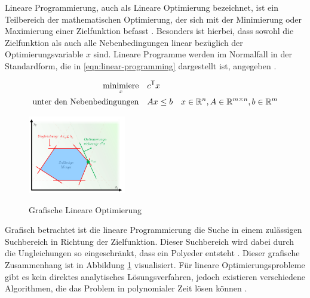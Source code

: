 Lineare Programmierung, auch als Lineare Optimierung bezeichnet, ist ein Teilbereich der mathematischen Optimierung, der sich mit der Minimierung oder Maximierung einer Zielfunktion befasst \cite{2024.MathWorksLP}. Besonders ist hierbei, dass sowohl die Zielfunktion als auch alle Nebenbedingungen linear bezüglich der Optimierungsvariable $x$ sind. Lineare Programme werden im Normalfall in der Standardform, die in \ref{eqn:linear-programming} dargestellt ist, angegeben \cite[S. 6]{2023.ConvexOptimization}.

\vspace*{-0.2cm}
\begin{align}
    \label{eqn:linear-programming}
    \minimize_{x}                     & \quad c^\mathsf{T} x                                                                                                    \\
    \text{unter den Nebenbedingungen} & \quad Ax \leq b      & x \in \mathbb{R}^{n}, A \in \mathbb{R}^{m\times n}, b \in \mathbb{R}^{m} \vspace*{-0.2cm} \notag
\end{align}

\begin{figure}
    \centering
    \vspace*{-0.75cm}
    \includegraphics[width=0.38\textwidth]{res/pictures/linear-programming.png}
    \caption[Grafische Lineare Optimierung]{\unskip}
    Grafische Lineare Optimierung
    \label{fig:linear-programming}
    \vspace*{-0.75cm}
\end{figure}

Grafisch betrachtet ist die lineare Programmierung die Suche in einem zulässigen Suchbereich in Richtung der Zielfunktion. Dieser Suchbereich wird dabei durch die Ungleichungen so eingeschränkt, dass ein Polyeder entsteht \cite[S. 31]{2023.ConvexOptimization}. Dieser grafische Zusammenhang ist in Abbildung \ref{fig:linear-programming} visualisiert. Für lineare Optimierungsprobleme gibt es kein direktes analytisches Lösungsverfahren, jedoch existieren verschiedene Algorithmen, die das Problem in polynomialer Zeit lösen können \cite[S. 6]{2023.ConvexOptimization}.

